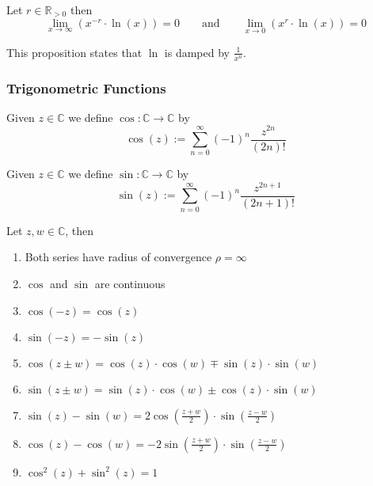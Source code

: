 \begin{proposition}
   Let \(r \in \mathbb{R}_{>0}\) then
   \[\lim_{x \to \infty} \left(x^{-r} \cdot \ln(x)\right) = 0 \qquad\text{and}\qquad \lim_{x \to 0} \left(x^r \cdot \ln(x)\right) = 0\]
\end{proposition}
\begin{remark}
   This proposition states that \(\ln\) is damped by \(\frac{1}{x^n}\).
\end{remark}

\subsubsection{Trigonometric Functions}
\begin{definition}[Cosine]
   Given \(z \in \mathbb{C}\) we define \(\cos: \mathbb{C} \to \mathbb{C}\) by
   \[\cos(z) := \sum_{n=0}^\infty (-1)^n \frac{z^{2n}}{(2n)!}\]
\end{definition}

\begin{definition}[Sine]
   Given \(z \in \mathbb{C}\) we define \(\sin: \mathbb{C} \to \mathbb{C}\) by
   \[\sin(z) := \sum_{n=0}^\infty (-1)^n \frac{z^{2n + 1}}{(2n+1)!}\]
\end{definition}

\begin{proposition}[Properties]
   Let \(z, w \in \mathbb{C}\), then
   \begin{enumerate}[label=\roman*, align=Center]
      \item Both series have radius of convergence \(\rho = \infty\)
      \item \(\cos\) and \(\sin\) are continuous
      \item \(\cos(-z) = \cos(z)\)
      \item \(\sin(-z) = -\sin(z)\)
      \item \(\cos(z \pm w) = \cos(z) \cdot \cos(w) \mp \sin(z) \cdot \sin(w)\)
      \item \(\sin(z \pm w) = \sin(z) \cdot \cos(w) \pm \cos(z) \cdot \sin(w)\)
      \item \(\sin(z) - \sin(w) = 2 \cos\left(\frac{z+w}{2}\right) \cdot \sin\left(\frac{z-w}{2}\right)\)
      \item \(\cos(z) - \cos(w) = -2 \sin\left(\frac{z+w}{2}\right) \cdot \sin\left(\frac{z-w}{2}\right)\)
      \item \(\cos^2(z) + \sin^2(z) = 1\)
   \end{enumerate}
\end{proposition}

